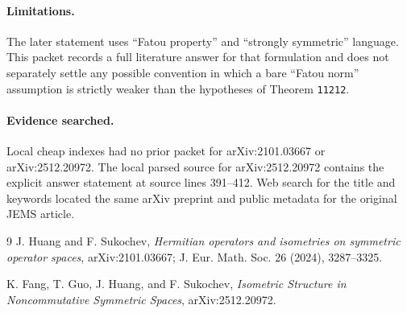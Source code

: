 \documentclass[11pt]{article}
\begin{document}
\paragraph{Limitations.}
The later statement uses ``Fatou property'' and ``strongly symmetric'' language.  This packet records a full literature answer for that formulation and does not separately settle any possible convention in which a bare ``Fatou norm'' assumption is strictly weaker than the hypotheses of Theorem \verb|11212|.

\paragraph{Evidence searched.}
Local cheap indexes had no prior packet for arXiv:2101.03667 or arXiv:2512.20972.  The local parsed source for arXiv:2512.20972 contains the explicit answer statement at source lines 391--412.  Web search for the title and keywords located the same arXiv preprint and public metadata for the original JEMS article.

\begin{thebibliography}{9}
J. Huang and F. Sukochev,
\emph{Hermitian operators and isometries on symmetric operator spaces},
arXiv:2101.03667; J. Eur. Math. Soc. 26 (2024), 3287--3325.

K. Fang, T. Guo, J. Huang, and F. Sukochev,
\emph{Isometric Structure in Noncommutative Symmetric Spaces},
arXiv:2512.20972.
\end{thebibliography}
\end{document}
